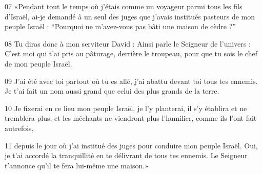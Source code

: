 
07 «Pendant tout le temps où j’étais comme un voyageur parmi tous les fils d’Israël, ai-je demandé à un seul des juges que j’avais institués pasteurs de mon peuple Israël : “Pourquoi ne m’avez-vous pas bâti une maison de cèdre ?”

08 Tu diras donc à mon serviteur David : Ainsi parle le Seigneur de l’univers : C’est moi qui t’ai pris au pâturage, derrière le troupeau, pour que tu sois le chef de mon peuple Israël.

09 J’ai été avec toi partout où tu es allé, j’ai abattu devant toi tous tes ennemis. Je t’ai fait un nom aussi grand que celui des plus grands de la terre.

10 Je fixerai en ce lieu mon peuple Israël, je l’y planterai, il s’y établira et ne tremblera plus, et les méchants ne viendront plus l’humilier, comme ils l’ont fait autrefois,

11 depuis le jour où j’ai institué des juges pour conduire mon peuple Israël. Oui, je t’ai accordé la tranquillité en te délivrant de tous tes ennemis. Le Seigneur t’annonce qu’il te fera lui-même une maison.»
